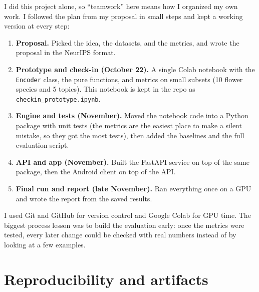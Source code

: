 \documentclass{article}
\begin{document}
I did this project alone, so ``teamwork'' here means how I organized my own work. I followed the plan from my proposal in small steps and kept a working version at every step:
\begin{enumerate}
  \item \textbf{Proposal.} Picked the idea, the datasets, and the metrics, and wrote the proposal in the NeurIPS format.
  \item \textbf{Prototype and check-in (October 22).} A single Colab notebook with the \texttt{Encoder} class, the pure functions, and metrics on small subsets (10 flower species and 5 topics). This notebook is kept in the repo as \texttt{checkin\_prototype.ipynb}.
  \item \textbf{Engine and tests (November).} Moved the notebook code into a Python package with unit tests (the metrics are the easiest place to make a silent mistake, so they got the most tests), then added the baselines and the full evaluation script.
  \item \textbf{API and app (November).} Built the FastAPI service on top of the same package, then the Android client on top of the API.
  \item \textbf{Final run and report (late November).} Ran everything once on a GPU and wrote the report from the saved results.
\end{enumerate}
I used Git and GitHub for version control and Google Colab for GPU time. The biggest process lesson was to build the evaluation early: once the metrics were tested, every later change could be checked with real numbers instead of by looking at a few examples.

\section{Reproducibility and artifacts}
\end{document}
